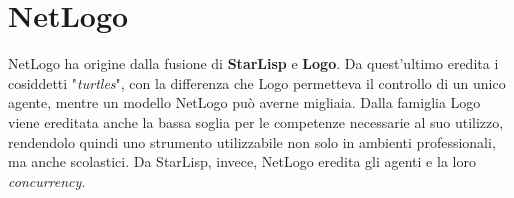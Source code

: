 \chapter {NetLogo} 
NetLogo ha origine dalla fusione di \textbf{StarLisp} e \textbf{Logo}. Da quest'ultimo eredita i cosiddetti "\textit{turtles}", con la differenza che Logo permetteva il controllo di un unico agente, mentre un modello NetLogo può averne migliaia. Dalla famiglia Logo viene ereditata anche la bassa soglia per le competenze necessarie al suo utilizzo, rendendolo quindi uno strumento utilizzabile non solo in ambienti professionali, ma anche scolastici. Da StarLisp, invece, NetLogo eredita gli agenti e la loro \textit{concurrency}.\\


 
